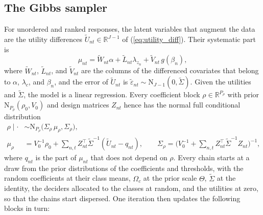 \documentclass[article,shortnames]{jss}
\begin{document}
\subsection{The Gibbs sampler} \label{sec:est_gibbs}

For unordered and ranked responses, the latent variables that augment the
data are the utility differences $\tilde{U}_{nt} \in \mathbb{R}^{J-1}$ of
(\ref{eq:utility_diff}). Their systematic part is
%
\begin{equation}
\label{eq:est_systematic}
\mu_{nt} = \tilde{W}_{nt}\alpha + \tilde{L}_{nt}\lambda_{z_n} +
\tilde{V}_{nt}\,g(\beta_n),
\end{equation}
%
where $\tilde{W}_{nt}$, $\tilde{L}_{nt}$, and $\tilde{V}_{nt}$ are the columns
of the differenced covariates that belong to $\alpha$, $\lambda_c$, and
$\beta_n$, and the error of $\tilde{U}_{nt}$ is $\tilde{\varepsilon}_{nt} \sim
\mathrm{N}_{J-1}(0, \tilde{\Sigma})$. Given the utilities and $\tilde{\Sigma}$,
the model is a linear regression. Every coefficient block
$\rho \in \mathbb{R}^{P_\rho}$ with prior $\mathrm{N}_{P_\rho}(\rho_0, V_0)$ and
design matrices $Z_{nt}$ hence has the normal full conditional distribution
%
\begin{align}
\rho \mid \cdot &\sim \mathrm{N}_{P_\rho}\big(\Sigma_\rho\, \mu_\rho,
\Sigma_\rho\big), \label{eq:est_regression} \\
\mu_\rho &= V_0^{-1}\rho_0 + \sum_{n, t} Z_{nt}^\top \tilde{\Sigma}^{-1}
(\tilde{U}_{nt} - q_{nt}), \qquad
\Sigma_\rho = \Big(V_0^{-1} + \sum_{n, t} Z_{nt}^\top \tilde{\Sigma}^{-1}
Z_{nt}\Big)^{-1}, \nonumber
\end{align}
%
where $q_{nt}$ is the part of $\mu_{nt}$ that does not depend on $\rho$. Every
chain starts at a draw from the prior distributions of the coefficients and
thresholds, with the random coefficients at their class means, $\Omega_c$ at the
prior scale $\Theta$, $\tilde{\Sigma}$ at the identity, the deciders
allocated to the classes at random, and the utilities at zero, so that the
chains start dispersed. One iteration then updates the following blocks in
turn:
%
\end{document}
